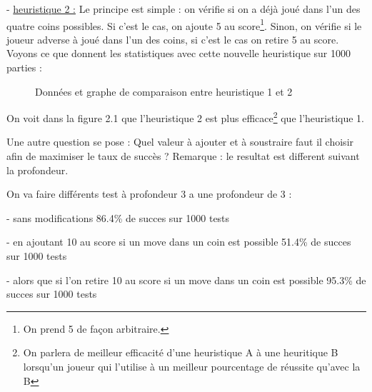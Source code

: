 \documentclass{report}
\begin{document}
- \underline{heuristique 2 :}
Le principe est simple : on vérifie si on a déjà joué dans l'un des quatre coins possibles. Si c'est le cas, on ajoute 5 au score\footnote{On prend 5 de façon arbitraire.}. Sinon, on vérifie si le joueur adverse à joué dans l'un des coins, si c'est le cas on retire 5 au score.
\newline
\newline
Voyons ce que donnent les statistiques avec cette nouvelle heuristique sur 1000 parties :
\begin{figure}[!h]
\begin{center}
\caption{Données et graphe de comparaison entre heuristique 1 et 2}
\end{center}

\end{figure}
On voit dans la figure 2.1 que l'heuristique 2 est plus efficace\footnote{On parlera de meilleur efficacité d'une heuristique A à une heuritique B lorsqu'un  joueur qui l'utilise à un meilleur pourcentage de réussite qu'avec la B}  que l'heuristique 1.\newline

Une autre question se pose : Quel valeur à ajouter et à soustraire faut il choisir afin de maximiser le taux de succès ?
Remarque : le resultat est different suivant la profondeur.

On va faire différents test à profondeur 3
a une profondeur de 3 :

- sans modifications
86.4\% de succes sur 1000 tests

- en ajoutant 10 au score si un move dans un coin est possible
51.4\% de succes sur 1000 tests

- alors que si l'on retire 10 au score si un move dans un coin est possible
95.3\% de succes sur 1000 tests
\newline
\end{document}
